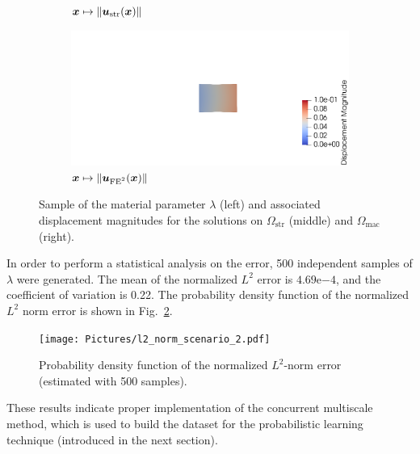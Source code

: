 \begin{figure}[!htb]
\begin{center}
\begin{subfigure}[b]{0.32\textwidth}
\begin{center}
            \end{center}
            \caption{${\boldsymbol{x}} \mapsto \lVert {\boldsymbol{u}}_\text{str}({\boldsymbol{x}})\rVert$}
        \end{subfigure}
        \begin{subfigure}[b]{0.32\textwidth}
            \begin{center}
                \includegraphics[trim = {12cm 0cm 0cm 0cm}, clip, width=\textwidth]{Pictures/omega_mac_11.png}
            \end{center}
            \caption{${\boldsymbol{x}} \mapsto \lVert {\boldsymbol{u}}_\text{FE$^2$}({\boldsymbol{x}})\rVert$}
        \end{subfigure}
    \end{center}
    \caption[Sample of the material parameter and associated displacement magnitudes for the solutions on macroscopic and mesoscopic scale.]{Sample of the material parameter $\lambda$ (left) and associated displacement magnitudes for the solutions on $\Omega_\text{str}$ (middle) and $\Omega_\text{mac}$ (right).}
    \label{fig:validation}
\end{figure}
In order to perform a statistical analysis on the error, 500 independent samples of $\lambda$ were generated. The mean of the normalized $L^2$ error is $4.69\mathrm{e}{-4}$, and the coefficient of variation is 0.22. The probability density function of the normalized $L^2$ norm error is shown in Fig.~\ref{fig:normalized_l2_norm_distribution}.
\begin{figure}[!htb]
    \begin{center}
        \texttt{[image: Pictures/l2\_norm\_scenario\_2.pdf]}
    \end{center}
    \caption[Probability density function of the normalized $L^2$-norm error.]{Probability density function of the normalized $L^2$-norm error (estimated with 500 samples).}
    \label{fig:normalized_l2_norm_distribution}
\end{figure}
These results indicate proper implementation of the concurrent multiscale method, which is used to build the dataset for the probabilistic learning technique (introduced in the next section).

